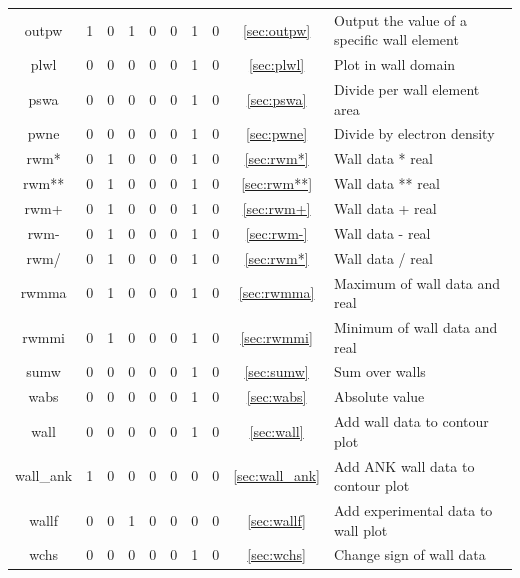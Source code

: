 \documentclass[a4paper,10pt]{report}
\begin{document}
\begin{center}
\begin{longtable}{|c|c|c|c|c|c|c|c|c|l|}
    outpw \index{b2plot, outpw}   & 1 & 0 & 1 & 0 & 0 & 1 & 0 & \ref{sec:outpw}    & Output the value of a specific wall element \\
    plwl \index{b2plot, plwl}     & 0 & 0 & 0 & 0 & 0 & 1 & 0 & \ref{sec:plwl}     & Plot in wall domain \\
    pswa \index{b2plot, pswa}     & 0 & 0 & 0 & 0 & 0 & 1 & 0 & \ref{sec:pswa}     & Divide per wall element area \\
    pwne \index{b2plot, pwne}     & 0 & 0 & 0 & 0 & 0 & 1 & 0 & \ref{sec:pwne}     & Divide by electron density \\
    rwm* \index{b2plot, rwm*}     & 0 & 1 & 0 & 0 & 0 & 1 & 0 & \ref{sec:rwm*}     & Wall data * real \\
    rwm** \index{b2plot, rwm**}   & 0 & 1 & 0 & 0 & 0 & 1 & 0 & \ref{sec:rwm**}    & Wall data ** real \\
    rwm+ \index{b2plot, rwm+}     & 0 & 1 & 0 & 0 & 0 & 1 & 0 & \ref{sec:rwm+}     & Wall data + real \\
    rwm- \index{b2plot, rwm-}     & 0 & 1 & 0 & 0 & 0 & 1 & 0 & \ref{sec:rwm-}     & Wall data - real \\
    rwm/ \index{b2plot, rwm/}     & 0 & 1 & 0 & 0 & 0 & 1 & 0 & \ref{sec:rwm*}     & Wall data / real \\
    rwmma \index{b2plot, rwmma}   & 0 & 1 & 0 & 0 & 0 & 1 & 0 & \ref{sec:rwmma}    & Maximum of wall data and real \\
    rwmmi \index{b2plot, rwmmi}   & 0 & 1 & 0 & 0 & 0 & 1 & 0 & \ref{sec:rwmmi}    & Minimum of wall data and real \\
    sumw \index{b2plot, sumw}     & 0 & 0 & 0 & 0 & 0 & 1 & 0 & \ref{sec:sumw}     & Sum over walls \\
    wabs \index{b2plot, wabs}     & 0 & 0 & 0 & 0 & 0 & 1 & 0 & \ref{sec:wabs}     & Absolute value \\
    wall \index{b2plot, wall}     & 0 & 0 & 0 & 0 & 0 & 1 & 0 & \ref{sec:wall}     & Add wall data to contour plot \\
    wall\_ank \index{b2plot, wall\_ank} & 1 & 0 & 0 & 0 & 0 & 0 & 0 & \ref{sec:wall_ank} & Add ANK wall data to contour plot \\
    wallf \index{b2plot, wallf}   & 0 & 0 & 1 & 0 & 0 & 0 & 0 & \ref{sec:wallf}    & Add experimental data to wall plot \\
    wchs \index{b2plot, wchs}     & 0 & 0 & 0 & 0 & 0 & 1 & 0 & \ref{sec:wchs}     & Change sign of wall data \\

\end{longtable}
\end{center}
\end{document}
